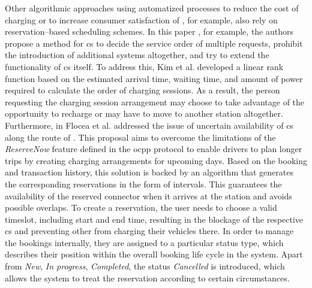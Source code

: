 \noindent Other algorithmic approaches using automatized processes to reduce the cost of charging or to increase consumer satisfaction of , for example, also rely on reservation--based scheduling schemes.
In this paper \cite{kim_efficient_2010}, for example, the authors propose a method for \acrshort{cs} to decide the service order of multiple requests, prohibit the introduction of additional systems altogether, and try to extend the functionality of \acrshort{cs} itself.
To address this, Kim et al. developed a linear rank function based on the estimated arrival time, waiting time, and amount of power required to calculate the order of charging sessions.
As a result, the person requesting the charging session arrangement may choose to take advantage of the opportunity to recharge or may have to move to another station altogether. \\
\noindent Furthermore, in \cite{flocea_electric_2022} Flocea et al. addressed the issue of uncertain availability of \acrshort{cs} along the route of .
This proposal aims to overcome the limitations of the \textit{ReserveNow} feature defined in the \acrshort{ocpp} protocol to enable drivers to plan longer trips by creating charging arrangements for upcoming days.
Based on the  booking and transaction history, this solution is backed by an algorithm that generates the corresponding reservations in the form of intervals.
This guarantees the availability of the reserved connector when it arrives at the station and avoids possible overlaps.
To create a reservation, the user needs to choose a valid timeslot, including start and end time, resulting in the blockage of the respective \acrshort{cs} and preventing other  from charging their vehicles there.
In order to manage the bookings internally, they are assigned to a particular status type, which describes their position within the overall booking life cycle in the system.
Apart from \textit{New}, \textit{In progress}, \textit{Completed}, the status \textit{Cancelled} is introduced, which allows the system to treat the reservation according to certain circumstances.
